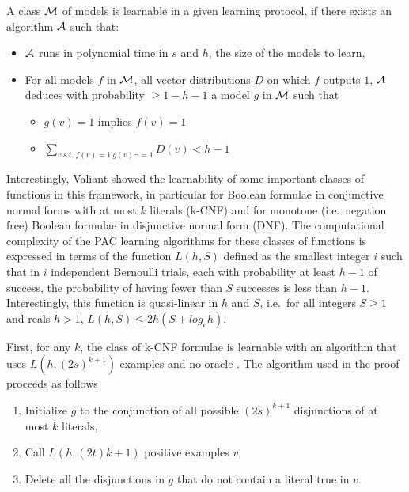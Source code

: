 \documentclass{llncs}
\begin{document}
A class $\cal M$ of models is learnable in a given learning protocol, if there exists an algorithm $\cal A$ such that:
\begin{itemize}
  \item
$\cal A$ runs in polynomial time in $s$ and $h$, the size of the models to learn,
  \item
For all models $f$ in $\cal M$,
all vector distributions $D$ on which $f$ outputs $1$,
$\cal A$ deduces with probability $\ge 1-h-1$ a model $g$ in $\cal M$ such that
\begin{itemize}
  \item
$g(v)=1$ implies $f(v)=1$
\item
$\sum_{v\ s.t.~f(v)=1\ g(v)\neg=1} D(v) < h-1$
\end{itemize}
\end{itemize}


Interestingly, Valiant showed the learnability of some important classes of functions in this framework,
in particular for Boolean formulae in conjunctive normal forms with at most $k$ literals (k-CNF)
and for monotone (i.e.~negation free) Boolean formulae in disjunctive normal form (DNF).
The computational complexity of the PAC learning algorithms for these classes of functions is expressed in terms of the function
$L(h,S)$ defined as the smallest integer $i$ such that
in $i$ independent Bernoulli trials, each with probability at least $h-1$ of success, the probability of having fewer than $S$ successes is less than $h-1$.
Interestingly, this function is quasi-linear in $h$ and $S$, i.e.~for all integers $S\ge 1$ and reals $h>1$, $L(h,S) \le 2h(S+log_eh)$.

First, for any $k$, the class of k-CNF formulae is learnable with an
algorithm that uses $L(h,(2s)^{k+1})$ examples and no oracle \cite{Valiant84cacm}.
The algorithm used in the proof proceeds as follows
\begin{enumerate}
  \item Initialize $g$ to the conjunction of all possible $(2s)^{k+1}$ disjunctions of at most $k$ literals,
\item Call $L(h,(2t)k+1)$ positive examples $v$,
\item Delete all the disjunctions in $g$ that do not contain a literal true in $v$.
\end{enumerate}
\end{document}
